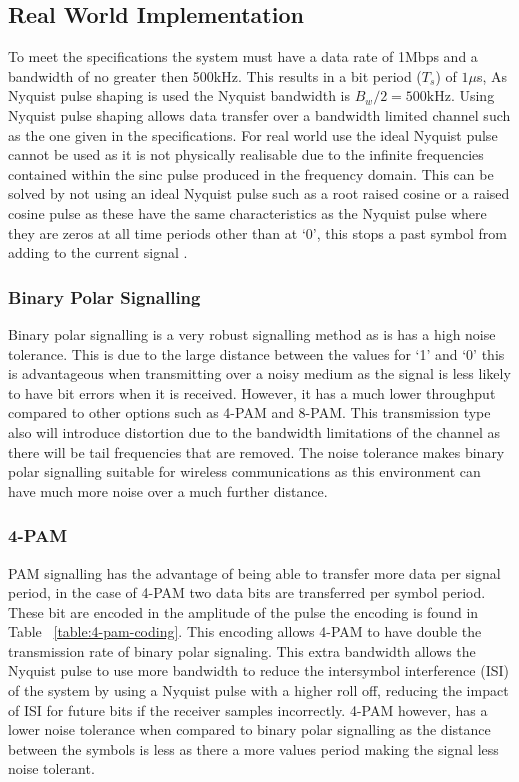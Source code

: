 \subsection{Real World Implementation}

To meet the specifications the system must have a data rate of 1Mbps and a bandwidth of no greater then
500kHz. This results in a bit period ($T_s$) of $1\mu$s, As Nyquist pulse shaping is used the Nyquist
bandwidth is $B_w / 2 = 500\textrm{kHz}$. Using Nyquist pulse shaping allows data transfer over a
bandwidth limited channel such as the one given in the specifications. For real world use the ideal
Nyquist pulse cannot be used as it is not physically realisable due to the infinite frequencies 
contained within the sinc pulse produced in the frequency domain. This can be solved by not using
an ideal Nyquist pulse such as a root raised cosine or a raised cosine pulse as these have the same characteristics
as the Nyquist pulse where they are zeros at all time periods other than at `0', this stops a past symbol
from adding to the current signal .

\subsubsection{Binary Polar Signalling}
Binary polar signalling is a very robust signalling method as is has a high noise tolerance. This is
due to the large distance between the values for `1' and `0' this is advantageous when transmitting
over a noisy medium as the signal is less likely to have bit errors when it is received.
However, it has a much lower throughput compared to other options such as 4-PAM and 8-PAM. This transmission type also
will introduce distortion due to the bandwidth limitations of the channel as there will be tail frequencies that are
removed. The noise tolerance makes binary polar signalling suitable for wireless communications as this environment 
can have much more noise over a much further distance.


\subsubsection{4-PAM}
PAM signalling has the advantage of being able to transfer more data per signal period, in the case of 4-PAM
two data bits are transferred per symbol period. These bit are encoded in the amplitude of the pulse
the encoding is found in Table ~\ref{table:4-pam-coding}. This encoding allows 4-PAM to have double the transmission
rate of binary polar signaling. This extra bandwidth allows the Nyquist pulse to use more bandwidth to reduce the intersymbol
interference (ISI) of the system by using a Nyquist pulse with a higher roll off, reducing the impact of ISI for future bits
if the receiver samples incorrectly. 4-PAM however, has a lower noise tolerance when compared to binary polar signalling as
the distance between the symbols is less as there a more values period making the signal less noise tolerant.

